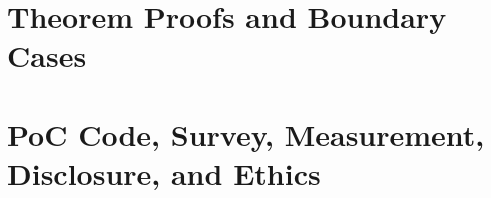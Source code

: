 \documentclass[conference]{IEEEtran}
\begin{document}
\section{Theorem Proofs and Boundary Cases}
\label{app:theorems}




\section{PoC Code, Survey, Measurement, Disclosure, and Ethics}
\label{app:supplemental}






\end{document}
